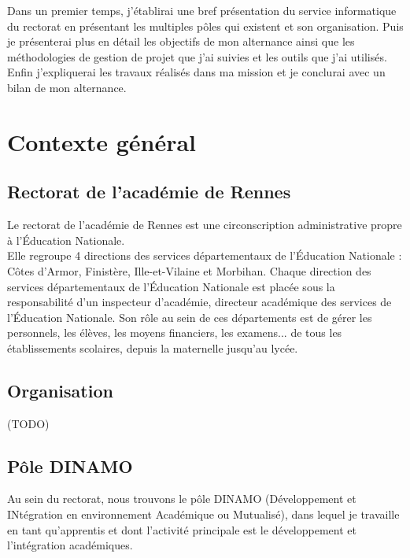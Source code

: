 \documentclass[12pt]{article}
\begin{document}
Dans un premier temps, j'établirai une bref présentation du service informatique du rectorat en présentant les multiples pôles qui existent et son organisation. Puis je présenterai plus en détail les objectifs de mon alternance ainsi que les méthodologies de gestion de projet que j'ai suivies et les outils que j'ai utilisés. Enfin j'expliquerai les travaux réalisés dans ma mission et je conclurai avec un bilan de mon alternance.

\newpage


   

\section{Contexte général}
\subsection{Rectorat de l’académie de Rennes}

Le rectorat de l'académie de Rennes est une circonscription administrative propre à l’Éducation Nationale.\\
Elle regroupe 4 directions des services départementaux de l'Éducation Nationale : 
Côtes d'Armor, Finistère, Ille-et-Vilaine et Morbihan. Chaque direction des services départementaux de l'Éducation Nationale est placée sous la responsabilité d'un inspecteur d'académie, directeur académique des services de l'Éducation Nationale. Son rôle au sein de ces départements est de gérer les personnels, les élèves, les moyens financiers, les examens... de tous les établissements scolaires, depuis la maternelle jusqu'au lycée.


\subsection{Organisation}
(TODO)

\subsection{Pôle DINAMO}

Au sein du rectorat, nous trouvons le pôle DINAMO (Développement et INtégration en environnement Académique ou Mutualisé), dans lequel je travaille en tant qu'apprentis et dont l'activité principale est le développement et l'intégration académiques. 
\end{document}
